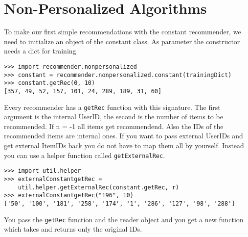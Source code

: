 \section{Non-Personalized Algorithms}
To make our first simple recommendations with the constant recommender,
we need to initialize an object of the constant class.
As parameter the constructor needs a dict for training
\begin{lstlisting}[style=python]
>>> import recommender.nonpersonalized
>>> constant = recommender.nonpersonalized.constant(trainingDict)
>>> constant.getRec(0, 10)
[357, 49, 52, 157, 101, 24, 289, 189, 31, 60]
\end{lstlisting}
Every recommender has a \lstinline!getRec! function with this signature. The first argument is the internal
UserID, the second is the number of items to be recommended. If n = -1 all items get recommendend.
Also the IDs of the recommended items are internal ones.
If you want to pass external UserIDs and get external ItemIDs back you do not have
to map them all by yourself. Instead you can use a helper function called
\lstinline!getExternalRec!.
\begin{lstlisting}[style=python]
>>> import util.helper
>>> externalConstantgetRec = 
    util.helper.getExternalRec(constant.getRec, r)
>>> externalConstantgetRec("196", 10)
['50', '100', '181', '258', '174', '1', '286', '127', '98', '288']
\end{lstlisting}
You pass the \lstinline!getRec! function and the reader object and you get a new function
which takes and returns only the original IDs.

